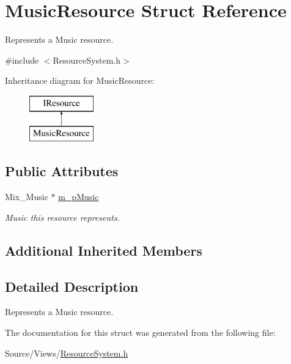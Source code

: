 \hypertarget{struct_music_resource}{}\section{Music\+Resource Struct Reference}
\label{struct_music_resource}


Represents a Music resource.  




{\ttfamily \#include $<$Resource\+System.\+h$>$}

Inheritance diagram for Music\+Resource\+:\begin{figure}[H]
\begin{center}
\leavevmode
\includegraphics[height=2.000000cm]{struct_music_resource}
\end{center}
\end{figure}
\subsection*{Public Attributes}
\begin{DoxyCompactItemize}
\item 
\mbox{\label{struct_music_resource_a8facd21a3775e85e15e4d0c7c5046e4b}} 
Mix\+\_\+\+Music $\ast$ \mbox{\hyperlink{struct_music_resource_a8facd21a3775e85e15e4d0c7c5046e4b}{m\+\_\+p\+Music}}
\begin{DoxyCompactList}\small\item\em Music this resource represents. \end{DoxyCompactList}\end{DoxyCompactItemize}
\subsection*{Additional Inherited Members}


\subsection{Detailed Description}
Represents a Music resource. 

The documentation for this struct was generated from the following file\+:\begin{DoxyCompactItemize}
\item 
Source/\+Views/\mbox{\hyperlink{_resource_system_8h}{Resource\+System.\+h}}\end{DoxyCompactItemize}
